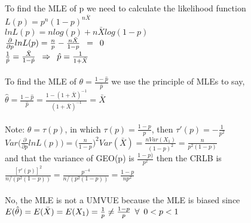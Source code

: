 \\

\\

To find the MLE of p we need to calculate the likelihood function\\

$L(p) = p^n (1-p)^{n\bar{X}}$\\

$lnL(p) = nlog(p) + n\bar{X} log(1-p)$\\

$\frac{\partial}{\partial p} lnL(p) = \frac{n}{p} - \frac{n\bar{X}}{1-p} \enskip = \enskip 0$\\

$\frac{1}{\hat{p}} = \frac{\bar{X}}{1-\hat{p}} \enskip \Rightarrow \enskip \hat{p} = \frac{1}{1+\bar{X}}$\\

\\

To find the MLE of $\theta = \frac{1-\hat{p}}{\hat{p}}$ we use the principle of MLEs to say,\\

$\hat{\theta} = \frac{1-\hat{p}}{\hat{p}} = \frac{1-(1+\bar{X})^{-1}}{(1+\bar{X})^{-1}} = \bar{X}$\\

\\

Note: $\theta = \tau(p)$, in which $\tau(p) = \frac{1-p}{p}$, then $\tau ' (p) = -\frac{1}{p^2}$\\

$Var\Big(\frac{\partial}{\partial p} lnL(p)\Big) = \Big( \frac{n}{1-p} \Big)^2 Var(\bar{X}) = \frac{nVar(X_1)}{(1-p)^2} = \frac{n}{p^2 (1-p)}$\\

and that the variance of GEO(p) is $\frac{1-p)}{p^2}$ then the CRLB is\\

$\frac{[\tau ' (p)]^2}{n/(p^2 (1-p))} = \frac{p^{-4}}{n/(p^2 (1-p))} = \frac{1-p}{np^2}$\\

\\

No, the MLE is not a UMVUE because the MLE is biased since\\

$E(\hat{\theta}) = E(\bar{X}) = E(X_1) = \frac{1}{p} \neq \frac{1-p}{p} \enskip \forall \enskip 0<p<1$\\

